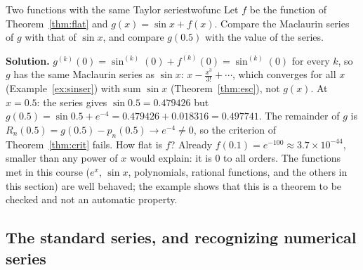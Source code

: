 \documentclass[11pt]{article}
\begin{document}
\begin{exmp}{Two functions with the same Taylor series}{twofunc}
Let $f$ be the function of Theorem~\ref{thm:flat} and $g(x)=\sin x+f(x)$. Compare the Maclaurin series of $g$ with that of $\sin x$, and compare $g(0.5)$ with the value of the series.

\textbf{Solution.} $g^{(k)}(0)=\sin^{(k)}(0)+f^{(k)}(0)=\sin^{(k)}(0)$ for every $k$, so $g$ has the same Maclaurin series as $\sin x$: $x-\frac{x^3}{3!}+\cdots$, which converges for all $x$ (Example~\ref{ex:sinser}) with sum $\sin x$ (Theorem~\ref{thm:esc}), not $g(x)$. At $x=0.5$: the series gives $\sin0.5=0.479426$ but $g(0.5)=\sin0.5+e^{-4}=0.479426+0.018316=0.497741$. The remainder of $g$ is $R_n(0.5)=g(0.5)-p_n(0.5)\to e^{-4}\ne0$, so the criterion of Theorem~\ref{thm:crit} fails. How flat is $f$? Already $f(0.1)=e^{-100}\approx3.7\times10^{-44}$, smaller than any power of $x$ would explain: it is $0$ to all orders. The functions met in this course ($e^x$, $\sin x$, polynomials, rational functions, and the others in this section) are well behaved; the example shows that this is a theorem to be checked and not an automatic property.
\end{exmp}

\subsection*{The standard series, and recognizing numerical series}
\end{document}
